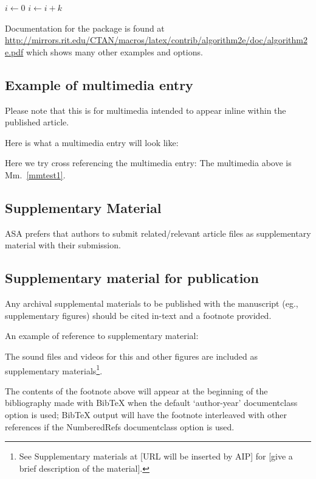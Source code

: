 \documentclass[reprint]{JASA}
\begin{document}
\begin{algorithmic}
    \State $i\gets 0$
\Else
        \State $i\gets i+k$
    \EndIf
\EndIf
\end{algorithmic}

Documentation for the package is found at 
\url{http://mirrors.rit.edu/CTAN/macros/latex/contrib/algorithm2e/doc/algorithm2e.pdf}
which shows many other examples and options.

\subsection{Example of multimedia entry}
Please note that this is for multimedia intended to appear inline
within the published article. 

Here is what a multimedia entry will look like:
\label{mmtest1}

Here we try cross referencing the multimedia entry: The multimedia
above is Mm.~\ref{mmtest1}.

\subsection{Supplementary Material}
ASA
prefers that authors to submit related/relevant article files as
supplementary material with their submission.

\subsection{Supplementary material for publication}
Any archival supplemental materials to be published with the
manuscript (eg., supplementary figures) should be cited in-text and a footnote provided.

An example of reference to supplementary material:

The sound files and videos for this and other figures
are included as supplementary materials\footnote{See
Supplementary materials at [URL will be inserted by AIP]
for [give a brief description of the material].}.

The contents of the footnote above will appear at the beginning of the
bibliography made with BibTeX when the default `author-year' documentclass option is used;
BibTeX output will have the footnote interleaved with other
references if the NumberedRefs documentclass option is used.
\end{document}
